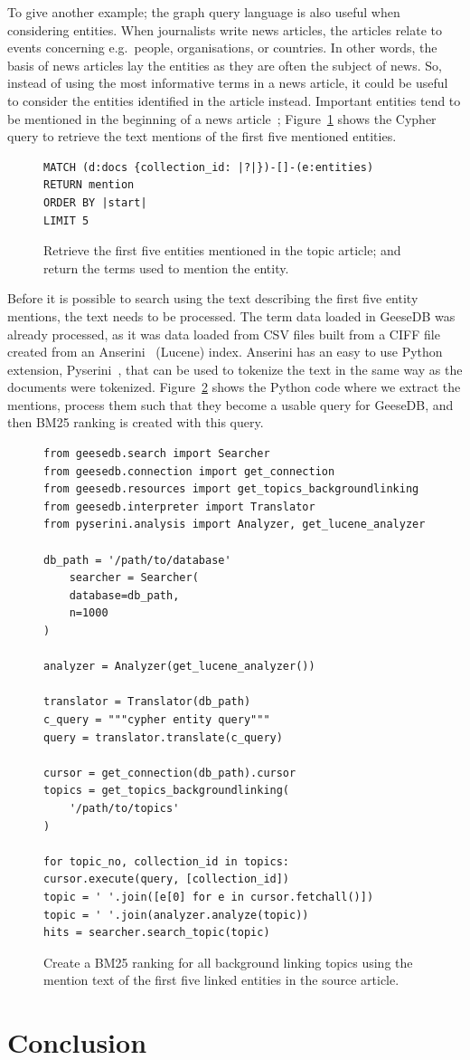 To give another example; the graph query language is also useful when considering entities. When journalists write news articles, the articles relate to events concerning e.g.\ people, organisations, or countries. In other words, the basis of news articles lay the entities as they are often the subject of news. So, instead of using the most informative terms in a news article, it could be useful to consider the entities identified in the article instead. Important entities tend to be mentioned in the beginning of a news article~\cite{entities-loc}; Figure~\ref{fig:entity-cypher} shows the Cypher query to retrieve the text mentions of the first five mentioned entities.

\begin{figure}
	\begin{verbatim}
MATCH (d:docs {collection_id: |?|})-[]-(e:entities)
RETURN mention
ORDER BY |start|
LIMIT 5
	\end{verbatim}
	\caption{Retrieve the first five entities mentioned in the topic article; and return the terms used to mention the entity.}
	\label{fig:entity-cypher}
\end{figure}
\noindent Before it is possible to search using the text describing the first five entity mentions, the text needs to be processed. The term data loaded in GeeseDB was already processed, as it was data loaded from CSV files built from a CIFF file created from an Anserini~\cite{anserini} (Lucene) index. Anserini has an easy to use Python extension, Pyserini~\cite{pyserini}, that can be used to tokenize the text in the same way as the documents were tokenized. Figure~\ref{fig:entities-code} shows the Python code where we extract the mentions, process them such that they become a usable query for GeeseDB, and then BM25 ranking is created with this query.

\begin{figure}
	\begin{verbatim}
from geesedb.search import Searcher
from geesedb.connection import get_connection
from geesedb.resources import get_topics_backgroundlinking
from geesedb.interpreter import Translator
from pyserini.analysis import Analyzer, get_lucene_analyzer

db_path = '/path/to/database'
	searcher = Searcher(
	database=db_path,
	n=1000
)

analyzer = Analyzer(get_lucene_analyzer())

translator = Translator(db_path)
c_query = """cypher entity query"""
query = translator.translate(c_query)

cursor = get_connection(db_path).cursor
topics = get_topics_backgroundlinking(
	'/path/to/topics'
)

for topic_no, collection_id in topics:
cursor.execute(query, [collection_id])
topic = ' '.join([e[0] for e in cursor.fetchall()])
topic = ' '.join(analyzer.analyze(topic))
hits = searcher.search_topic(topic)
	\end{verbatim}
	\caption{Create a BM25 ranking for all background linking topics using the mention text of the first five linked entities in the source article.}
	\label{fig:entities-code}
\end{figure}

\section{Conclusion}
